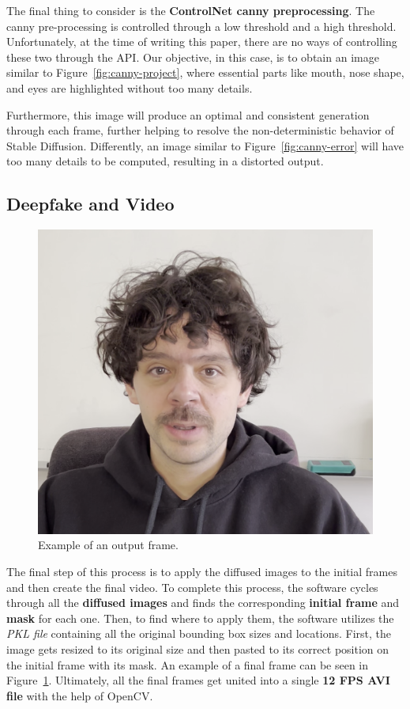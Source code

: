 \documentclass[preprint]{elsarticle}
\begin{document}
The final thing to consider is the \textbf{ControlNet canny preprocessing}. 
The canny pre-processing is controlled through a low threshold and a high threshold. 
Unfortunately, at the time of writing this paper, there are no ways of  controlling these two through the API.
Our objective, in this case, is to obtain an image similar to Figure~\ref{fig:canny-project},  where essential parts like mouth, nose shape, and eyes are highlighted without too many details. 

Furthermore, this image will produce an optimal and consistent generation through each frame, further helping to resolve the non-deterministic behavior of Stable Diffusion. Differently, an image similar to Figure~\ref{fig:canny-error} will have too many details to be computed, 
resulting in a distorted output.



\subsection{Deepfake and Video}

\begin{figure}[t]
	\centering
	\includegraphics[scale=0.15, keepaspectratio]{img/project_img/output.png}
	\caption{Example of an output frame.}
	\label{fig:output}
\end{figure}

The final step of this process is to apply the diffused images to the initial frames and then create the final video. 
To complete this process, the software cycles through all the \textbf{diffused images}  and finds the corresponding \textbf{initial frame} and \textbf{mask} for each one. 
Then, to find where to apply them, the software utilizes the \emph{PKL file} containing all the original bounding box sizes and locations.  First, the image gets resized to its original size and then pasted  to its correct position on the initial frame with its mask. 
An example of a final frame can be seen in Figure~\ref{fig:output}.
Ultimately, all the final frames get united into a single \textbf{12 FPS AVI file} with the help of OpenCV.
\end{document}
